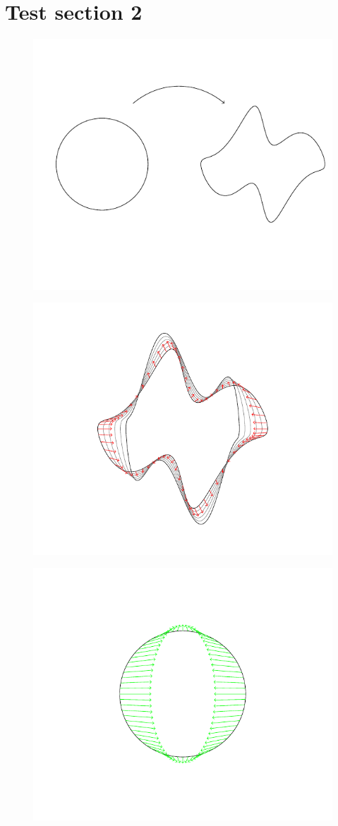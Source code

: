 \documentclass[a4,danish]{article}
\theoremstyle{break}
\theoremstyle{definition}
\theoremstyle{Break}
\begin{document}
\section*{Test section 2}
\label{sec:test-section-2}

\begin{figure}
  \centerline{\includegraphics[width=0.7\linewidth]{circle_mapping.pdf}}
\end{figure}

\begin{figure}
  \centerline{\includegraphics[width=0.7\linewidth]{path.pdf}}
\end{figure}

\begin{figure}
  \centerline{\includegraphics[width=0.7\linewidth]{circle_vectorfield.pdf}}
\end{figure}
\end{document}
